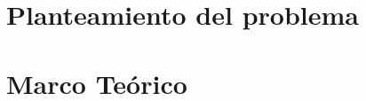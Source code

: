 \documentclass[10pt]{book}
\author{Escuela Superior de Cómputo}
\title{\varProyecto}
\subtitle {\varCveDocumento--\varDocumento}
\begin{document}
    \thispagestyle{empty}

    \maketitle
    
    \makeDocInfo
    \bigskip\\
    \makeObservaciones[3cm]
    \vspace{2cm}
    \makeFirmas

    \frontmatter
    \tableofcontents
    \listoffigures
    \listoftables
    \mainmatter


    \chapter{Planteamiento del problema}
    \label{ch:planteamiento}
	
	
	\chapter{Marco Teórico} 
	\label{ch:marco}
	
	
	
	
	
	
	
\end{document}
